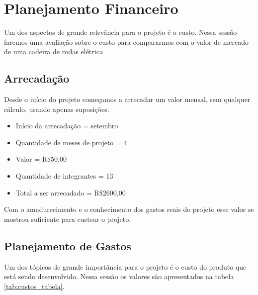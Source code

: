 \chapter[Planejamento Financeiro]{Planejamento Financeiro}

Um dos aspectos de grande relevância para o projeto é o custo. Nessa sessão faremos uma avaliação sobre o custo para compararmos com o valor de mercado de uma cadeira de rodas elétrica

\section {Arrecadação}
Desde o início do projeto começamos a arrecadar um valor mensal, sem qualquer cálculo, usando apenas suposições.
  \begin{itemize}
    \item Início da arrecadação = setembro
    \item Quantidade de meses de projeto = 4
    \item Valor = R\$50,00
    \item Quantidade de integrantes = 13
    \item Total a ser arrecadado = R\$2600,00
  \end{itemize}
Com o amadurecimento e o conhecimento dos gastos reais do projeto esse valor se mostrou suficiente para custear o projeto.

\section {Planejamento de Gastos}

Um dos tópicos de grande importância para o projeto é o custo do produto que está sendo desenvolvido. Nessa sessão os valores são apresentados na tabela \ref{tab:custos_tabela}.

